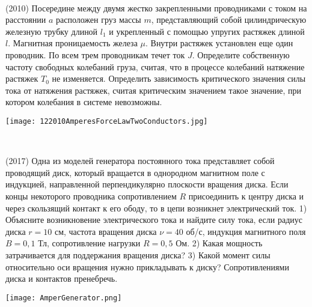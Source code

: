 \begin{ex}
\hspace{0pt} \\
\begin{minipage}{.65\textwidth}
(2010) Посередине между двумя жестко закрепленными проводниками с током на расстоянии $a$ расположен груз массы $m$, представляющий собой цилиндрическую железную трубку длиной $l_1$ и укрепленный с помощью упругих растяжек длиной $l$. 
Магнитная проницаемость железа $\mu$. Внутри растяжек установлен еще один проводник. По всем трем проводникам течет ток $J$. 
Определите собственную частоту свободных колебаний груза, считая, что в процессе колебаний натяжение растяжек $T_0$ не изменяется. 
Определить зависимость критического значения силы тока от натяжения растяжек, считая критическим значением такое значение, при котором колебания в системе невозможны.
\end{minipage}
\begin{minipage}{.35\textwidth}
\centering
\texttt{[image: 122010AmperesForceLawTwoConductors.jpg]}
\end{minipage}
\begin{ans}
\end{ans}
\end{ex}

\begin{ex}
\hspace{0pt} \\
\begin{minipage}{.65\textwidth}
(2017) Одна из моделей генератора постоянного тока представляет собой проводящий диск, который вращается в однородном магнитном поле с индукцией,
направленной перпендикулярно плоскости вращения диска. Если концы некоторого проводника сопротивлением $R$ присоединить к центру диска и через скользящий контакт к его ободу, то в цепи возникнет электрический ток. 1) Объясните
возникновение электрического тока и найдите силу тока, если радиус диска $r = 10$ см, частота вращения диска $\nu = 40$ об/с, индукция магнитного поля $B = 0,1$ Тл, сопротивление нагрузки $R = 0,5$ Ом. 2) Какая мощность затрачивается для поддержания вращения диска? 3) Какой момент силы относительно оси вращения нужно прикладывать к диску? Сопротивлениями диска и контактов пренебречь.
\end{minipage}
\begin{minipage}{.35\textwidth}
\centering
\texttt{[image: AmperGenerator.png]}
\end{minipage}
\begin{ans}
\end{ans}
\end{ex}

